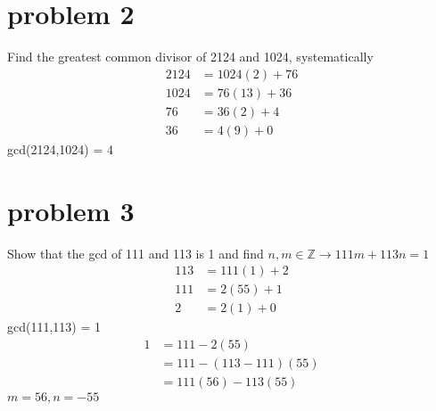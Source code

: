 \documentclass{article}
\begin{document}
\begin{enumerate}
    \end{enumerate}

    \section{problem 2}
    Find the greatest common divisor of 2124 and 1024, systematically
    \\
    \begin{align*}
        2124 &= 1024(2)+76\\
        1024 &= 76(13) + 36\\
        76 &= 36(2) + 4\\
        36 &= 4(9) + 0
    \end{align*}
    gcd(2124,1024) = 4
    \section{problem 3}
    Show that the gcd of 111 and 113 is 1 and find $n,m \in \mathbb{Z} \rightarrow 111m + 113n = 1$
    \begin{align*}
        113 &= 111(1) + 2\\
        111 &= 2(55) + 1\\
        2 &= 2(1) + 0
    \end{align*}
    gcd(111,113) = 1
    \begin{align*}
        1 &= 111 - 2(55)\\
          &= 111 - (113-111)(55)\\
          &= 111(56) - 113(55)
    \end{align*}
    $m = 56, n = -55$
\end{document}
